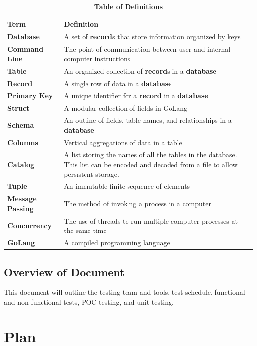 \documentclass[12pt, titlepage]{article}
\begin{document}
\begin{table}[!htbp]
\caption{\textbf{Table of Definitions}} \label{Table}

\begin{tabularx}{\textwidth}{p{3cm}X}
\toprule
\textbf{Term} & \textbf{Definition}\\
\midrule
\textbf{Database} & A set of \textbf{record}s that store information organized by keys\\
\textbf{Command Line} & The point of communication between user and internal computer instructions\\
\textbf{Table} & An organized collection of \textbf{record}s in a \textbf{database}\\
\textbf{Record} & A single row of data in a \textbf{database}\\
\textbf{Primary Key} & A unique identifier for a \textbf{record} in a \textbf{database}\\
\textbf{Struct} & A modular collection of fields in GoLang \\
\textbf{Schema} & An outline of fields, table names, and relationships in a \textbf{database} \\
\textbf{Columns} & Vertical aggregations of data in a table \\
\textbf{Catalog} & A list storing the names of all the tables in the database. This list can be encoded and decoded from a file to allow persistent storage.\\
\textbf{Tuple} & An immutable finite sequence of elements\\
\textbf{Message Passing} & The method of invoking a process in a computer\\
\textbf{Concurrency} & The use of threads to run multiple computer processes at the same time\\
\textbf{GoLang} & A compiled programming language\\

\bottomrule
\end{tabularx}

\end{table}	

\subsection{Overview of Document}
This document will outline the testing team and tools, test schedule, functional and non functional tests, POC testing, and unit testing.

\section{Plan}
	
\end{document}

